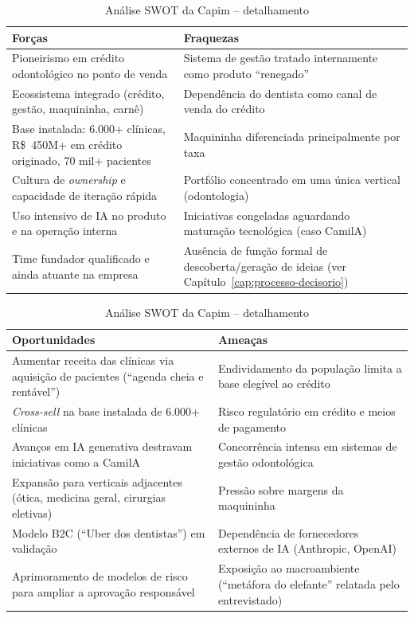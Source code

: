 \begin{table}[h]
  \centering
  \caption{Análise SWOT da Capim -- detalhamento}
  \label{tab:swot}
  \begin{tabularx}{\textwidth}{XX}
    \toprule
    \textbf{Forças} & \textbf{Fraquezas} \\
    \midrule
    Pioneirismo em crédito odontológico no ponto de venda &
    Sistema de gestão tratado internamente como produto ``renegado'' \\
    Ecossistema integrado (crédito, gestão, maquininha, carnê) &
    Dependência do dentista como canal de venda do crédito \\
    Base instalada: 6.000+ clínicas, R\$~450M+ em crédito originado, 70 mil+ pacientes &
    Maquininha diferenciada principalmente por taxa \\
    Cultura de \textit{ownership} e capacidade de iteração rápida &
    Portfólio concentrado em uma única vertical (odontologia) \\
    Uso intensivo de IA no produto e na operação interna &
    Iniciativas congeladas aguardando maturação tecnológica (caso CamilA) \\
    Time fundador qualificado e ainda atuante na empresa &
    Ausência de função formal de descoberta/geração de ideias (ver Capítulo~\ref{cap:processo-decisorio}) \\
    \bottomrule
  \end{tabularx}

  \vspace{2mm}
  \begin{tabularx}{\textwidth}{XX}
    \toprule
    \textbf{Oportunidades} & \textbf{Ameaças} \\
    \midrule
    Aumentar receita das clínicas via aquisição de pacientes (``agenda cheia e rentável'') &
    Endividamento da população limita a base elegível ao crédito \\
    \textit{Cross-sell} na base instalada de 6.000+ clínicas &
    Risco regulatório em crédito e meios de pagamento \\
    Avanços em IA generativa destravam iniciativas como a CamilA &
    Concorrência intensa em sistemas de gestão odontológica \\
    Expansão para verticais adjacentes (ótica, medicina geral, cirurgias eletivas) &
    Pressão sobre margens da maquininha \\
    Modelo B2C (``Uber dos dentistas'') em validação &
    Dependência de fornecedores externos de IA (Anthropic, OpenAI) \\
    Aprimoramento de modelos de risco para ampliar a aprovação responsável &
    Exposição ao macroambiente (``metáfora do elefante'' relatada pelo entrevistado) \\
    \bottomrule
  \end{tabularx}
\end{table}

